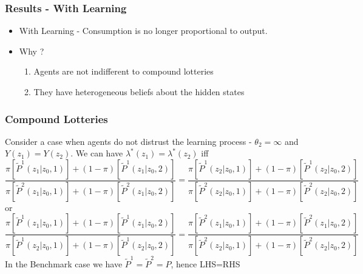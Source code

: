 \documentclass{beamer}
\theoremstyle{Definition}
\begin{document}
  \begin{frame}
\frametitle{Results - With Learning}
\begin{itemize}
\item With Learning  - Consumption is no longer proportional to output. 	
\item Why ?
\begin{enumerate}
	\item Agents are not indifferent to compound lotteries
	\item They  have heterogeneous beliefs about the hidden states
\end{enumerate}

	\end{itemize}
\end{frame}



\begin{frame}
\frametitle{Compound Lotteries}
Consider a case when agents do not distrust the learning process - $\theta_2=\infty$ and  $Y(z_1)=Y(z_2)$.
We can have $\lambda^*(z_1)=\lambda^*(z_2)$ iff
\scriptsize{
\[\frac{\pi[\tilde{P}^1(z_1 |z_0,1)]+(1-\pi)[\tilde{P}^1(z_1 | z_0,2)]}{\pi[\tilde{P}^2(z_1 |z_0,1)]+(1-\pi)[\tilde{P}^2(z_1 | z_0,2)]} = \frac{\pi[\tilde{P}^1(z_2 |z_0,1)]+(1-\pi)[\tilde{P}^1(z_2 | z_0,2)]}{\pi[\tilde{P}^2(z_2 |z_0,1)]+(1-\pi)[\tilde{P}^2(z_2 | z_0,2)]}\]
	}
	or
\scriptsize{
\[\frac{\pi[\tilde{P}^1(z_1 |z_0,1)]+(1-\pi)[\tilde{P}^1(z_1 | z_0,2)]}{\pi[\tilde{P}^1(z_2 |z_0,1)]+(1-\pi)[\tilde{P}^1(z_2 | z_0,2)]} = \frac{\pi[\tilde{P}^2(z_1 |z_0,1)]+(1-\pi)[\tilde{P}^2(z_1 | z_0,2)]}{\pi[\tilde{P}^2(z_2 |z_0,1)]+(1-\pi)[\tilde{P}^2(z_2 | z_0,2)]}\]
	}	 
In the Benchmark case we have $\tilde{P}^1=\tilde{P}^2=P$, hence LHS=RHS
  \end{frame}
  
\end{document}

